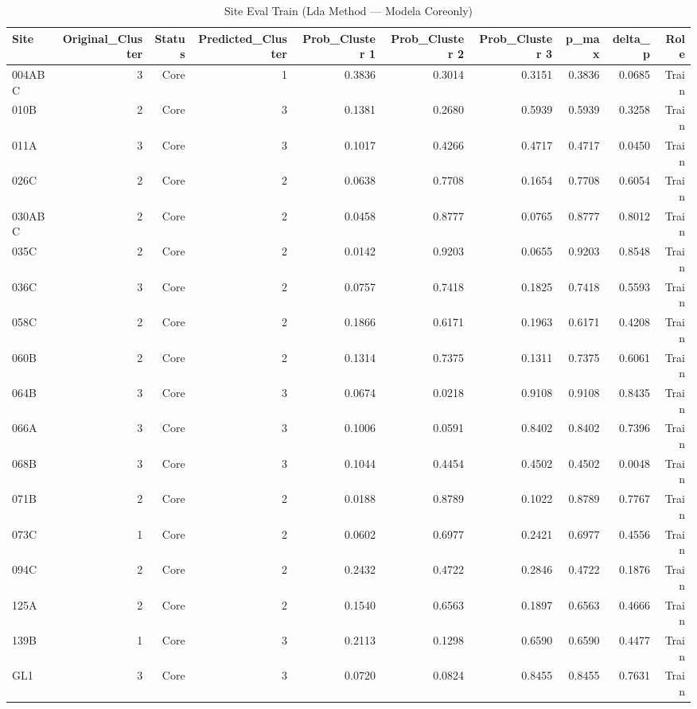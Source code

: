 \begin{table}[htbp]
  \centering
  \caption{Site Eval Train (Lda Method — Modela Coreonly)}
  \label{tab:LDA_Method_ModelA_CoreOnly_tables_site_eval_train}
  \small
  \begin{tabular}{lrrrrrrrrr}
    \toprule
    Site & Original\_Cluster & Status & Predicted\_Cluster & Prob\_Cluster 1 & Prob\_Cluster 2 & Prob\_Cluster 3 & p\_max & delta\_p & Role \\
    \midrule
    004ABC & 3 & Core & 1 & 0.3836 & 0.3014 & 0.3151 & 0.3836 & 0.0685 & Train \\
    010B & 2 & Core & 3 & 0.1381 & 0.2680 & 0.5939 & 0.5939 & 0.3258 & Train \\
    011A & 3 & Core & 3 & 0.1017 & 0.4266 & 0.4717 & 0.4717 & 0.0450 & Train \\
    026C & 2 & Core & 2 & 0.0638 & 0.7708 & 0.1654 & 0.7708 & 0.6054 & Train \\
    030ABC & 2 & Core & 2 & 0.0458 & 0.8777 & 0.0765 & 0.8777 & 0.8012 & Train \\
    035C & 2 & Core & 2 & 0.0142 & 0.9203 & 0.0655 & 0.9203 & 0.8548 & Train \\
    036C & 3 & Core & 2 & 0.0757 & 0.7418 & 0.1825 & 0.7418 & 0.5593 & Train \\
    058C & 2 & Core & 2 & 0.1866 & 0.6171 & 0.1963 & 0.6171 & 0.4208 & Train \\
    060B & 2 & Core & 2 & 0.1314 & 0.7375 & 0.1311 & 0.7375 & 0.6061 & Train \\
    064B & 3 & Core & 3 & 0.0674 & 0.0218 & 0.9108 & 0.9108 & 0.8435 & Train \\
    066A & 3 & Core & 3 & 0.1006 & 0.0591 & 0.8402 & 0.8402 & 0.7396 & Train \\
    068B & 3 & Core & 3 & 0.1044 & 0.4454 & 0.4502 & 0.4502 & 0.0048 & Train \\
    071B & 2 & Core & 2 & 0.0188 & 0.8789 & 0.1022 & 0.8789 & 0.7767 & Train \\
    073C & 1 & Core & 2 & 0.0602 & 0.6977 & 0.2421 & 0.6977 & 0.4556 & Train \\
    094C & 2 & Core & 2 & 0.2432 & 0.4722 & 0.2846 & 0.4722 & 0.1876 & Train \\
    125A & 2 & Core & 2 & 0.1540 & 0.6563 & 0.1897 & 0.6563 & 0.4666 & Train \\
    139B & 1 & Core & 3 & 0.2113 & 0.1298 & 0.6590 & 0.6590 & 0.4477 & Train \\
    GL1 & 3 & Core & 3 & 0.0720 & 0.0824 & 0.8455 & 0.8455 & 0.7631 & Train \\

\end{tabular}
\end{table}
